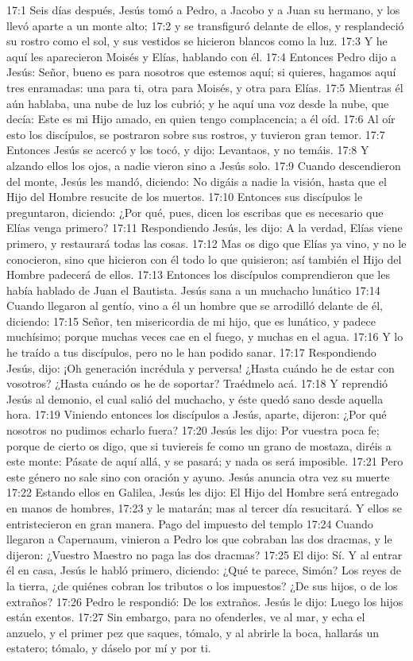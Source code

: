 17:1 Seis días después, Jesús tomó a Pedro, a Jacobo y a Juan su hermano, y los llevó aparte a un monte alto; 
17:2 y se transfiguró delante de ellos, y resplandeció su rostro como el sol, y sus vestidos se hicieron blancos como la luz. 
17:3 Y he aquí les aparecieron Moisés y Elías, hablando con él. 
17:4 Entonces Pedro dijo a Jesús: Señor, bueno es para nosotros que estemos aquí; si quieres, hagamos aquí tres enramadas: una para ti, otra para Moisés, y otra para Elías. 
17:5 Mientras él aún hablaba, una nube de luz los cubrió; y he aquí una voz desde la nube, que decía: Este es mi Hijo amado, en quien tengo complacencia; a él oíd. 
17:6 Al oír esto los discípulos, se postraron sobre sus rostros, y tuvieron gran temor. 
17:7 Entonces Jesús se acercó y los tocó, y dijo: Levantaos, y no temáis. 
17:8 Y alzando ellos los ojos, a nadie vieron sino a Jesús solo. 
17:9 Cuando descendieron del monte, Jesús les mandó, diciendo: No digáis a nadie la visión, hasta que el Hijo del Hombre resucite de los muertos. 
17:10 Entonces sus discípulos le preguntaron, diciendo: ¿Por qué, pues, dicen los escribas que es necesario que Elías venga primero? 
17:11 Respondiendo Jesús, les dijo: A la verdad, Elías viene primero, y restaurará todas las cosas. 
17:12 Mas os digo que Elías ya vino, y no le conocieron, sino que hicieron con él todo lo que quisieron; así también el Hijo del Hombre padecerá de ellos. 
17:13 Entonces los discípulos comprendieron que les había hablado de Juan el Bautista. 
Jesús sana a un muchacho lunático  
17:14 Cuando llegaron al gentío, vino a él un hombre que se arrodilló delante de él, diciendo: 
17:15 Señor, ten misericordia de mi hijo, que es lunático, y padece muchísimo; porque muchas veces cae en el fuego, y muchas en el agua. 
17:16 Y lo he traído a tus discípulos, pero no le han podido sanar. 
17:17 Respondiendo Jesús, dijo: ¡Oh generación incrédula y perversa! ¿Hasta cuándo he de estar con vosotros? ¿Hasta cuándo os he de soportar? Traédmelo acá. 
17:18 Y reprendió Jesús al demonio, el cual salió del muchacho, y éste quedó sano desde aquella hora. 
17:19 Viniendo entonces los discípulos a Jesús, aparte, dijeron: ¿Por qué nosotros no pudimos echarlo fuera? 
17:20 Jesús les dijo: Por vuestra poca fe; porque de cierto os digo, que si tuviereis fe como un grano de mostaza, diréis a este monte: Pásate de aquí allá, y se pasará; y nada os será imposible. 
17:21 Pero este género no sale sino con oración y ayuno. 
Jesús anuncia otra vez su muerte  
17:22 Estando ellos en Galilea, Jesús les dijo: El Hijo del Hombre será entregado en manos de hombres, 
17:23 y le matarán; mas al tercer día resucitará. Y ellos se entristecieron en gran manera. 
Pago del impuesto del templo 
17:24 Cuando llegaron a Capernaum, vinieron a Pedro los que cobraban las dos dracmas, y le dijeron: ¿Vuestro Maestro no paga las dos dracmas? 
17:25 El dijo: Sí. Y al entrar él en casa, Jesús le habló primero, diciendo: ¿Qué te parece, Simón? Los reyes de la tierra, ¿de quiénes cobran los tributos o los impuestos? ¿De sus hijos, o de los extraños? 
17:26 Pedro le respondió: De los extraños. Jesús le dijo: Luego los hijos están exentos. 
17:27 Sin embargo, para no ofenderles, ve al mar, y echa el anzuelo, y el primer pez que saques, tómalo, y al abrirle la boca, hallarás un estatero; tómalo, y dáselo por mí y por ti. 
